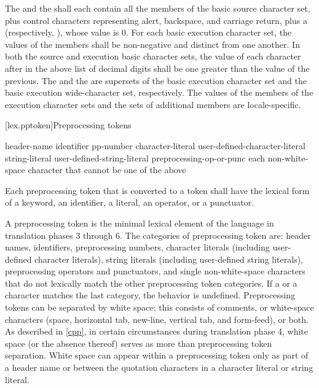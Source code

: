 \pnum
The  and the
shall each contain all the members of the
basic source character set, plus control characters representing alert,
backspace, and carriage return, plus a 
(respectively, ), whose value is 0.
For each basic execution character set, the values of the
members shall be non-negative and distinct from one another. In both the
source and execution basic character sets, the value of each character
after  in the above list of decimal digits shall be one greater
than the value of the previous. The 
and the  are
supersets of the
basic execution character set and the basic execution wide-character
set, respectively. The values of the members of the execution character sets
and the sets of additional members
are locale-specific.%

[lex.pptoken]{Preprocessing tokens}

%
\begin{bnf}
\br
    header-name\br
    identifier\br
    pp-number\br
    character-literal\br
    user-defined-character-literal\br
    string-literal\br
    user-defined-string-literal\br
    preprocessing-op-or-punc\br
    \textnormal{each non-white-space character that cannot be one of the above}
\end{bnf}

\pnum
Each preprocessing token that is converted to a token
shall have the lexical form of a keyword, an identifier, a literal, an
operator, or a punctuator.

\pnum
A preprocessing token is the minimal lexical element of the language in translation
phases 3 through 6. The categories of preprocessing token are: header names,
identifiers, preprocessing numbers, character literals (including user-defined character
literals), string literals (including user-defined string literals), preprocessing
operators and punctuators, and single non-white-space characters that do not lexically
match the other preprocessing token categories. If a  or a  character
matches the last category, the behavior is undefined. Preprocessing tokens can be
separated by
%
white space;
%
this consists of comments, or white-space
characters (space, horizontal tab, new-line, vertical tab, and
form-feed), or both. As described in \ref{cpp}, in certain
circumstances during translation phase 4, white space (or the absence
thereof) serves as more than preprocessing token separation. White space
can appear within a preprocessing token only as part of a header name or
between the quotation characters in a character literal or string
literal.

